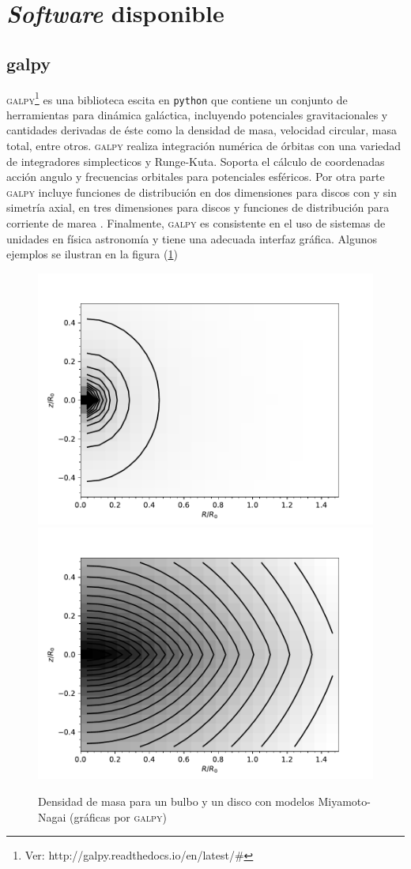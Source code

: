 \section{\emph{Software} disponible}

\subsection{galpy}

\textsc{galpy}\footnote{Ver: http://galpy.readthedocs.io/en/latest/\#} es una biblioteca escita en \verb+python+ que contiene un conjunto de herramientas para dinámica galáctica, incluyendo potenciales gravitacionales y cantidades derivadas de éste como la densidad de masa, velocidad circular, masa total, entre otros. \textsc{galpy} realiza integración numérica de órbitas con una variedad de integradores simplecticos y Runge-Kuta. Soporta el cálculo de coordenadas acción angulo y frecuencias orbitales para potenciales esféricos. Por otra parte \textsc{galpy} incluye funciones de distribución en dos dimensiones para discos con y sin simetría axial, en tres dimensiones para discos y funciones de distribución para corriente de marea \cite{B15}. Finalmente, \textsc{galpy} es consistente en el uso de sistemas de unidades en física astronomía y tiene una adecuada interfaz gráfica. Algunos ejemplos se ilustran en la figura (\ref{fig:Fi1})

\begin{figure}
  \centering
    \includegraphics[width=0.4\columnwidth]{Kap2/Bulge.pdf}
    \includegraphics[width=0.4\columnwidth]{Kap2/TnDisk.pdf}
  \caption{Densidad de masa para un bulbo y un disco con modelos Miyamoto-Nagai (gráficas por \textsc{galpy})}
  \label{fig:Fi1}
\end{figure}

